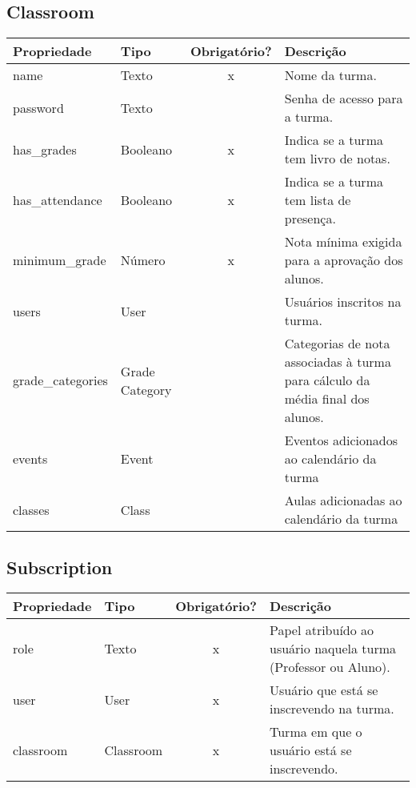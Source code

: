 \subsection{Classroom} \label{Classroom}
\begin{table}[H]
	\footnotesize
	\begin{tabularx}{\textwidth}{|p{2.6cm}|X|c|p{7.8cm}|}   \hline \rowcolor[rgb]{0.8,0.8,0.8}
		
		\textbf{Propriedade} & \textbf{Tipo} & \textbf{Obrigatório?} & \centerline{\textbf{Descrição}} \\\hline  	
		
		name & Texto & x & Nome da turma. \\\hline		
		password & Texto & {} & Senha de acesso para a turma. \\\hline	
		has\_grades & Booleano & x & Indica se a turma tem livro de notas. \\\hline	
		has\_attendance & Booleano & x & Indica se a turma tem lista de presença. \\ \hline	
		minimum\_grade & Número & x & Nota mínima exigida para a aprovação dos alunos. \\\hline
		users & User & {} & Usuários inscritos na turma. \\\hline
		grade\_categories & Grade Category & {} & Categorias de nota associadas à turma para cálculo da média final dos alunos. \\\hline
		events & Event & {} & Eventos adicionados ao calendário da turma \\\hline
		classes & Class & {} & Aulas adicionadas ao calendário da turma \\\hline	
		
	\end{tabularx}	
\end{table}

\subsection{Subscription} \label{Subscription}
\begin{table}[H]
	\footnotesize
	\begin{tabularx}{\textwidth}{|X|X|c|p{7.8cm}|}   \hline \rowcolor[rgb]{0.8,0.8,0.8}
		
		\textbf{Propriedade} & \textbf{Tipo} & \textbf{Obrigatório?} & \centerline{\textbf{Descrição}} \\\hline  	
		
		role & Texto & x & Papel atribuído ao usuário naquela turma (Professor ou Aluno). \\\hline
		user & User & x & Usuário que está se inscrevendo na turma. \\\hline
		classroom & Classroom & x & Turma em que o usuário está se inscrevendo. \\\hline		
		
	\end{tabularx}	
\end{table}


